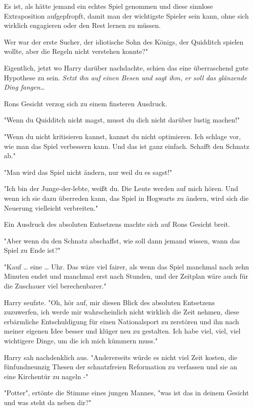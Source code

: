 {Es ist, als hätte jemand ein echtes Spiel genommen und diese sinnlose Extraposition aufgepfropft, damit man der wichtigste Spieler sein kann, ohne sich wirklich engagieren oder den Rest lernen zu müssen.

Wer war der erste Sucher, der idiotische Sohn des Königs, der Quidditch spielen wollte, aber die Regeln nicht verstehen konnte?"

Eigentlich, jetzt wo Harry darüber nachdachte, schien das eine überraschend gute Hypothese zu sein. \emph{Setzt ihn auf einen Besen und sagt ihm, er soll das glänzende Ding fangen…}

Rons Gesicht verzog sich zu einem finsteren Ausdruck.

"Wenn du Quidditch nicht magst, musst du dich nicht darüber lustig machen!"

"Wenn du nicht kritisieren kannst, kannst du nicht optimieren. Ich schlage vor, wie man das Spiel verbessern kann. Und das ist ganz einfach. Schafft den Schnatz ab."

"Man wird das Spiel nicht ändern, nur weil du es sagst!"

"Ich bin der Junge-der-lebte, weißt du. Die Leute werden auf mich hören. Und wenn ich sie dazu überreden kann, das Spiel in Hogwarts zu ändern, wird sich die Neuerung vielleicht verbreiten."

Ein Ausdruck des absoluten Entsetzens machte sich auf Rons Gesicht breit.

"Aber wenn du den Schnatz abschaffst, wie soll dann jemand wissen, wann das Spiel zu Ende ist?"

"Kauf … eine … Uhr. Das wäre viel fairer, als wenn das Spiel manchmal nach zehn Minuten endet und manchmal erst nach Stunden, und der Zeitplan wäre auch für die Zuschauer viel berechenbarer."

Harry seufzte. "Oh, hör auf, mir diesen Blick des absoluten Entsetzens zuzuwerfen, ich werde mir wahrscheinlich nicht wirklich die Zeit nehmen, diese erbärmliche Entschuldigung für einen Nationalsport zu zerstören und ihn nach meiner eigenen Idee besser und klüger neu zu gestalten. Ich habe viel, viel, viel wichtigere Dinge, um die ich mich kümmern muss."

Harry sah nachdenklich aus. "Andererseits würde es nicht viel Zeit kosten, die fünfundneunzig Thesen der schnatzfreien Reformation zu verfassen und sie an eine Kirchentür zu nageln -"

"Potter", ertönte die Stimme eines jungen Mannes, "was ist das in deinem Gesicht und was steht da neben dir?"

}
